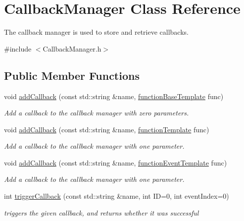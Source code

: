 \hypertarget{class_callback_manager}{\section{Callback\-Manager Class Reference}
\label{d6/d24/class_callback_manager}
}


The callback manager is used to store and retrieve callbacks.  




{\ttfamily \#include $<$Callback\-Manager.\-h$>$}

\subsection*{Public Member Functions}
\begin{DoxyCompactItemize}
\item 
void \hyperlink{class_callback_manager_a0e6019364d757f9a575b05a749360d46}{add\-Callback} (const std\-::string \&name, \hyperlink{_callback_manager_8h_afb6653b2315b76a8dcbae52ed1be8b8f}{function\-Base\-Template} func)
\begin{DoxyCompactList}\small\item\em Add a callback to the callback manager with zero parameters. \end{DoxyCompactList}\item 
void \hyperlink{class_callback_manager_ab90d8ef9caf4ef1f05863c074a68228d}{add\-Callback} (const std\-::string \&name, \hyperlink{_callback_manager_8h_a73a0c6254a0b5ab661ca1f3bd5f3d99c}{function\-Template} func)
\begin{DoxyCompactList}\small\item\em Add a callback to the callback manager with one parameter. \end{DoxyCompactList}\item 
void \hyperlink{class_callback_manager_afd7add06423bd69b799528b9b864f646}{add\-Callback} (const std\-::string \&name, \hyperlink{_callback_manager_8h_a3459e948765053b6cb9e3b0b5efb5906}{function\-Event\-Template} func)
\begin{DoxyCompactList}\small\item\em Add a callback to the callback manager with one parameter. \end{DoxyCompactList}\item 
int \hyperlink{class_callback_manager_a4c5dc4430f0fb5cebe240be020a8fbe9}{trigger\-Callback} (const std\-::string \&name, int I\-D=0, int event\-Index=0)
\begin{DoxyCompactList}\small\item\em triggers the given callback, and returns whether it was successful \end{DoxyCompactList}\item 

\end{DoxyCompactItemize}
